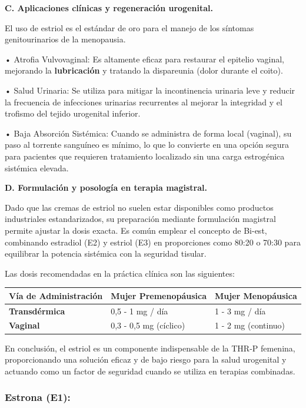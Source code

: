 \documentclass[
  spanish,
]{article}
\newcounter{none} %
\begin{document}
\textbf{C. Aplicaciones clínicas y regeneración urogenital.}

El uso de estriol es el estándar de oro para el manejo de los síntomas genitourinarios de la menopausia.

• Atrofia Vulvovaginal: Es altamente eficaz para restaurar el epitelio vaginal, mejorando la \textbf{lubricación} y tratando la dispareunia (dolor durante el coito).

• Salud Urinaria: Se utiliza para mitigar la incontinencia urinaria leve y reducir la frecuencia de infecciones urinarias recurrentes al mejorar la integridad y el trofismo del tejido urogenital inferior.

• Baja Absorción Sistémica: Cuando se administra de forma local (vaginal), su paso al torrente sanguíneo es mínimo, lo que lo convierte en una opción segura para pacientes que requieren tratamiento localizado sin una carga estrogénica sistémica elevada.

\textbf{D. Formulación y posología en terapia magistral.}

Dado que las cremas de estriol no suelen estar disponibles como productos industriales estandarizados, su preparación mediante formulación magistral permite ajustar la dosis exacta. Es común emplear el concepto de Bi-est, combinando estradiol (E2) y estriol (E3) en proporciones como 80:20 o 70:30 para equilibrar la potencia sistémica con la seguridad tisular.

Las dosis recomendadas en la práctica clínica son las siguientes:

{\def\LTcaptype{none} %
\begin{longtable}[]{@{}lll@{}}
\toprule\noalign{}
Vía de Administración & Mujer Premenopáusica & Mujer Menopáusica \\
\midrule\noalign{}
\endhead
\bottomrule\noalign{}
\endlastfoot
\textbf{Transdérmica} & 0,5 - 1 mg / día & 1 - 3 mg / día \\
\textbf{Vaginal} & 0,3 - 0,5 mg (cíclico) & 1 - 2 mg (continuo) \\
\end{longtable}
}

En conclusión, el estriol es un componente indispensable de la THR-P femenina, proporcionando una solución eficaz y de bajo riesgo para la salud urogenital y actuando como un factor de seguridad cuando se utiliza en terapias combinadas.

\subsubsection{Estrona (E1):}\label{estrona-e1}
\end{document}
